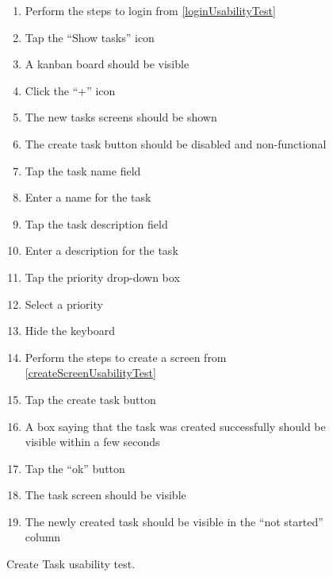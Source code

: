 \begin{figure}[H]
    \begin{enumerate}
        \item Perform the steps to login from \autoref{loginUsabilityTest}
        \item Tap the “Show tasks” icon
        \item A kanban board should be visible
        \item Click the “+” icon
        \item The new tasks screens should be shown
        \item The create task button should be disabled and non-functional
        \item Tap the task name field
        \item Enter a name for the task
        \item Tap the task description field
        \item Enter a description for the task
        \item Tap the priority drop-down box
        \item Select a priority
        \item Hide the keyboard
        \item Perform the steps to create a screen from \autoref{createScreenUsabilityTest}
        \item Tap the create task button
        \item A box saying that the task was created successfully should be visible within a few seconds
        \item Tap the “ok” button
        \item The task screen should be visible
        \item The newly created task should be visible in the “not started” column
    \end{enumerate}
    \caption{Create Task usability test.}
    \label{createTaskUsabilityTest}
\end{figure}



